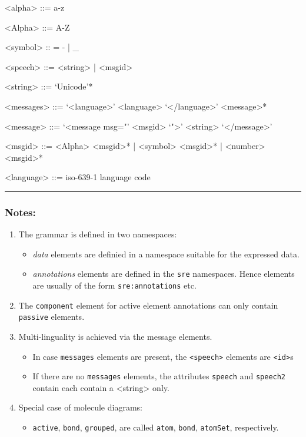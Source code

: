 \documentclass{article}
\begin{document}
\begin{grammar}
  <alpha> ::= a-z

  <Alpha> ::= A-Z

  <symbol> :: = - | _

  <speech> ::=  <string> | <msgid>
  
  <string> ::= `Unicode'*

  <messages> ::= `<language>' <language> `</language>' <message>*

  <message> ::= `<message msg="' <msgid> `">' <string> `</message>'

  <msgid> ::= <Alpha> <msgid>* | <symbol> <msgid>* | <number> <msgid>*
  
  <language> ::= iso-639-1 language code
  
\end{grammar}
\hrule

\subsubsection*{Notes:}

\begin{enumerate}
\item The grammar is defined in two namespaces:
\begin{itemize}
\item \emph{data} elements are definied in a namespace suitable for the expressed data.
\item \emph{annotations} elements are defined in the \texttt{sre}
  namespaces. Hence elements are usually of the form \texttt{sre:annotations}
  etc.
\end{itemize}
\item The \texttt{component} element for active element annotations can only
  contain \texttt{passive} elements.
\item Multi-linguality is achieved via the message elements.
\begin{itemize}
\item In case \texttt{messages} elements are present, the \texttt{<speech>} elements are \texttt{<id>}s
\item If there are no \texttt{messages} elements, the attributes \texttt{speech}
  and \texttt{speech2} contain each contain a <string> only.
\end{itemize}
\item Special case of molecule diagrams:
\begin{itemize}
\item \texttt{active}, \texttt{bond}, \texttt{grouped}, are called
  \texttt{atom}, \texttt{bond}, \texttt{atomSet}, respectively.
\end{itemize}
\end{enumerate}
\end{document}
